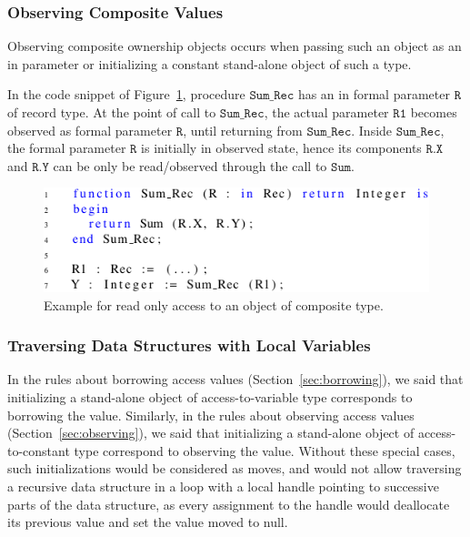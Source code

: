 \documentclass{llncs}
\newcommand\var[1]{\ensuremath{\mathtt{#1}}}
\newcommand{\keyword}[1]{\textsf{#1}}
\begin{document}
   
\subsubsection{Observing Composite Values}
\label{subsubsec:extendingBorrowing}

Observing composite ownership objects occurs when passing such an object as an \keyword{in} parameter or initializing a constant stand-alone object of such a type. 

In the code snippet of Figure~\ref{fig:observingComposite}, procedure \var{Sum\_Rec} has an \keyword{in} formal parameter \var{R} of record type.
At the point of call to \var{Sum\_Rec}, the actual parameter \var{R1} becomes observed as formal parameter \var{R}, until returning from \var{Sum\_Rec}. Inside \var{Sum\_Rec},
the formal parameter \var{R} is initially in observed state, hence its components \var{R.X} and \var{R.Y} can be only be read/observed through the call to \var{Sum}.


\begin{figure}[htb!]
\centering
  \captionsetup{justification=centering,margin=0.6cm}
   \includegraphics[]{observingComposite}
   \caption{Example for read only access to an object of composite type.}
   \label{fig:observingComposite}
\end{figure}



\subsubsection{Traversing Data Structures with Local Variables}

In the rules about borrowing access values (Section~\ref{sec:borrowing}), we said that initializing a stand-alone object of access-to-variable type corresponds to
borrowing the value. Similarly, in the rules about observing access values (Section~\ref{sec:observing}), we said that initializing a stand-alone object of
access-to-constant type correspond to observing the value. Without these special cases, such initializations would be considered as moves, and would not allow
traversing a recursive data structure in a loop with a local handle pointing to successive parts of the data structure, as every assignment to the handle would
deallocate its previous value and set the value moved to null.
\end{document}
